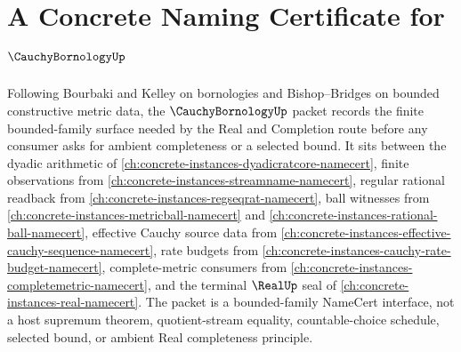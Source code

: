 \chapter{A Concrete Naming Certificate for $\CauchyBornologyUp$}
\label{ch:concrete-instances-cauchy-bornology-namecert}

Following Bourbaki and Kelley on bornologies and Bishop--Bridges on bounded constructive metric data, the $\CauchyBornologyUp$ packet records the finite bounded-family surface needed by the Real and Completion route before any consumer asks for ambient completeness or a selected bound. It sits between the dyadic arithmetic of \autoref{ch:concrete-instances-dyadicratcore-namecert}, finite observations from \autoref{ch:concrete-instances-streamname-namecert}, regular rational readback from \autoref{ch:concrete-instances-regseqrat-namecert}, ball witnesses from \autoref{ch:concrete-instances-metricball-namecert} and \autoref{ch:concrete-instances-rational-ball-namecert}, effective Cauchy source data from \autoref{ch:concrete-instances-effective-cauchy-sequence-namecert}, rate budgets from \autoref{ch:concrete-instances-cauchy-rate-budget-namecert}, complete-metric consumers from \autoref{ch:concrete-instances-completemetric-namecert}, and the terminal $\RealUp$ seal of \autoref{ch:concrete-instances-real-namecert}. The packet is a bounded-family NameCert interface, not a host supremum theorem, quotient-stream equality, countable-choice schedule, selected bound, or ambient Real completeness principle.


